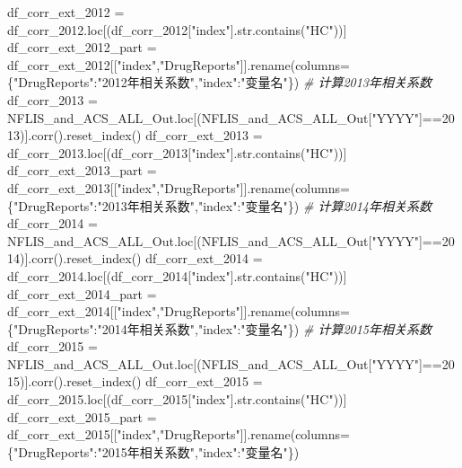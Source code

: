 \documentclass[
]{article}
\newenvironment{Shaded}{}{}
\newcommand{\BuiltInTok}[1]{#1}
\newcommand{\CommentTok}[1]{\textcolor[rgb]{0.38,0.63,0.69}{\textit{#1}}}
\newcommand{\DecValTok}[1]{\textcolor[rgb]{0.25,0.63,0.44}{#1}}
\newcommand{\NormalTok}[1]{#1}
\newcommand{\OperatorTok}[1]{\textcolor[rgb]{0.40,0.40,0.40}{#1}}
\newcommand{\StringTok}[1]{\textcolor[rgb]{0.25,0.44,0.63}{#1}}
\begin{document}
\begin{Shaded}
\begin{Highlighting}[]
\NormalTok{df\_corr\_ext\_2012 }\OperatorTok{=}\NormalTok{ df\_corr\_2012.loc[(df\_corr\_2012[}\StringTok{"index"}\NormalTok{].}\BuiltInTok{str}\NormalTok{.contains(}\StringTok{"HC"}\NormalTok{))]}
\NormalTok{df\_corr\_ext\_2012\_part }\OperatorTok{=}\NormalTok{ df\_corr\_ext\_2012[[}\StringTok{"index"}\NormalTok{,}\StringTok{"DrugReports"}\NormalTok{]].rename(columns}\OperatorTok{=}\NormalTok{\{}\StringTok{"DrugReports"}\NormalTok{:}\StringTok{"2012年相关系数"}\NormalTok{,}\StringTok{"index"}\NormalTok{:}\StringTok{"变量名"}\NormalTok{\})}
\CommentTok{\# 计算2013年相关系数}
\NormalTok{df\_corr\_2013 }\OperatorTok{=}\NormalTok{ NFLIS\_and\_ACS\_ALL\_Out.loc[(NFLIS\_and\_ACS\_ALL\_Out[}\StringTok{"YYYY"}\NormalTok{]}\OperatorTok{==}\DecValTok{2013}\NormalTok{)].corr().reset\_index()}
\NormalTok{df\_corr\_ext\_2013 }\OperatorTok{=}\NormalTok{ df\_corr\_2013.loc[(df\_corr\_2013[}\StringTok{"index"}\NormalTok{].}\BuiltInTok{str}\NormalTok{.contains(}\StringTok{"HC"}\NormalTok{))]}
\NormalTok{df\_corr\_ext\_2013\_part }\OperatorTok{=}\NormalTok{ df\_corr\_ext\_2013[[}\StringTok{"index"}\NormalTok{,}\StringTok{"DrugReports"}\NormalTok{]].rename(columns}\OperatorTok{=}\NormalTok{\{}\StringTok{"DrugReports"}\NormalTok{:}\StringTok{"2013年相关系数"}\NormalTok{,}\StringTok{"index"}\NormalTok{:}\StringTok{"变量名"}\NormalTok{\})}
\CommentTok{\# 计算2014年相关系数}
\NormalTok{df\_corr\_2014 }\OperatorTok{=}\NormalTok{ NFLIS\_and\_ACS\_ALL\_Out.loc[(NFLIS\_and\_ACS\_ALL\_Out[}\StringTok{"YYYY"}\NormalTok{]}\OperatorTok{==}\DecValTok{2014}\NormalTok{)].corr().reset\_index()}
\NormalTok{df\_corr\_ext\_2014 }\OperatorTok{=}\NormalTok{ df\_corr\_2014.loc[(df\_corr\_2014[}\StringTok{"index"}\NormalTok{].}\BuiltInTok{str}\NormalTok{.contains(}\StringTok{"HC"}\NormalTok{))]}
\NormalTok{df\_corr\_ext\_2014\_part }\OperatorTok{=}\NormalTok{ df\_corr\_ext\_2014[[}\StringTok{"index"}\NormalTok{,}\StringTok{"DrugReports"}\NormalTok{]].rename(columns}\OperatorTok{=}\NormalTok{\{}\StringTok{"DrugReports"}\NormalTok{:}\StringTok{"2014年相关系数"}\NormalTok{,}\StringTok{"index"}\NormalTok{:}\StringTok{"变量名"}\NormalTok{\})}
\CommentTok{\# 计算2015年相关系数}
\NormalTok{df\_corr\_2015 }\OperatorTok{=}\NormalTok{ NFLIS\_and\_ACS\_ALL\_Out.loc[(NFLIS\_and\_ACS\_ALL\_Out[}\StringTok{"YYYY"}\NormalTok{]}\OperatorTok{==}\DecValTok{2015}\NormalTok{)].corr().reset\_index()}
\NormalTok{df\_corr\_ext\_2015 }\OperatorTok{=}\NormalTok{ df\_corr\_2015.loc[(df\_corr\_2015[}\StringTok{"index"}\NormalTok{].}\BuiltInTok{str}\NormalTok{.contains(}\StringTok{"HC"}\NormalTok{))]}
\NormalTok{df\_corr\_ext\_2015\_part }\OperatorTok{=}\NormalTok{ df\_corr\_ext\_2015[[}\StringTok{"index"}\NormalTok{,}\StringTok{"DrugReports"}\NormalTok{]].rename(columns}\OperatorTok{=}\NormalTok{\{}\StringTok{"DrugReports"}\NormalTok{:}\StringTok{"2015年相关系数"}\NormalTok{,}\StringTok{"index"}\NormalTok{:}\StringTok{"变量名"}\NormalTok{\})}

\end{Highlighting}
\end{Shaded}
\end{document}

